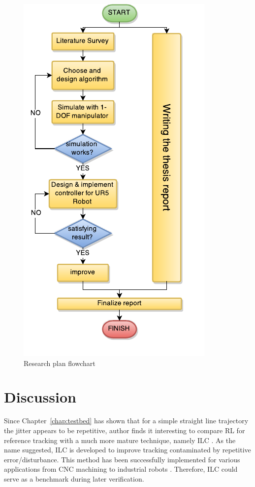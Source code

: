 \begin{figure}
\centering
\includegraphics[width=0.5\linewidth]{research_plan.pdf}
\caption{Research plan flowchart}
\label{fig:flowchart}
\end{figure}

\section{Discussion}\label{sec:discussion}
Since Chapter~\ref{chap:testbed} has shown that for a simple straight line trajectory the jitter appears to be repetitive, author finds it interesting to compare \ac{RL} for reference tracking with a much more mature technique, namely \ac{ILC} \cite{4048052}. As the name suggested, \ac {ILC} is developed to improve tracking contaminated by repetitive error/disturbance. This method has been successfully implemented for various applications from CNC machining \cite{299157} to industrial robots \cite{1044377}. Therefore, \ac {ILC} could serve as a benchmark during later verification.
